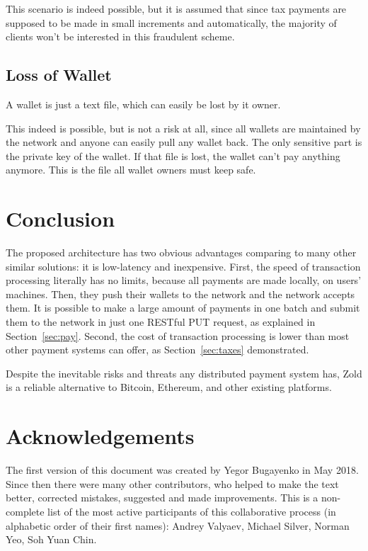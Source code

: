 \documentclass[11pt,oneside]{article}
\begin{document}
This scenario is indeed possible, but it is assumed that since tax payments are
supposed to be made in small increments and automatically, the majority of
clients won't be interested in this fraudulent scheme.

\subsection{Loss of Wallet}

A wallet is just a text file, which can easily be lost by it owner.

This indeed is possible, but is not a risk at all, since all wallets are
maintained by the network and anyone can easily pull any wallet back.
The only sensitive part is the private key of the wallet. If that file
is lost, the wallet can't pay anything anymore. This is the file all
wallet owners must keep safe.

\section{Conclusion}

The proposed architecture has two obvious advantages comparing to many other
similar solutions: it is low-latency and inexpensive. First, the speed of transaction processing
literally has no limits, because all payments are made locally, on users'
machines. Then, they push their wallets to the network and the network accepts
them. It is possible to make a large amount of payments in one batch and
submit them to the network in just one RESTful PUT request, as explained
in Section~\ref{sec:pay}. Second, the cost of transaction processing
is lower than most other payment systems can offer, as Section~\ref{sec:taxes}
demonstrated.

Despite the inevitable risks and threats any distributed payment system
has, Zold is a reliable alternative to Bitcoin, Ethereum, and
other existing platforms.

\section{Acknowledgements}

The first version of this document was created by Yegor Bugayenko in May 2018.
Since then there were many other contributors, who helped to make the text better,
corrected mistakes, suggested and made improvements. This is a non-complete list
of the most active participants of this collaborative process
(in alphabetic order of their first names):
%
Andrey Valyaev,
Michael Silver,
Norman Yeo,
Soh Yuan Chin.

\raggedright
\printbibliography%
\end{document}
